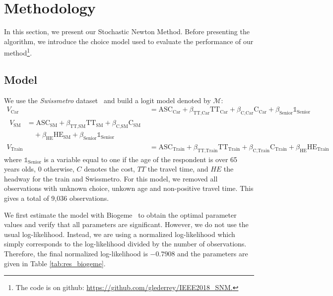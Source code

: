 \documentclass[conference]{IEEEtran}
\begin{document}
\vspace{-0.2cm}
\section{Methodology}
\label{sec:methodo}

In this section, we present our Stochastic Newton Method. Before presenting the algorithm, we introduce the choice model used to evaluate the  performance of our method\footnote{The code is on github: \href{https://github.com/glederrey/IEEE2018\_SNM}{https://github.com/glederrey/IEEE2018\_SNM.}}.
\subsection{Model}
\label{sec:model}

We use the {\it Swissmetro} dataset~\cite{bierlaire_acceptance_2001} and build a logit model denoted by $\mathcal{M}$:
\begin{align}
\label{eq:model}
V_{\text{Car}} &= \text{ASC}_{\text{Car}} + \beta_{\text{TT,Car}} \text{TT}_{\text{Car}} + \beta_{\text{C,Car}} \text{C}_{\text{Car}} + \beta_{\text{Senior}}\mathbb{1}_{\text{Senior}} \nonumber \\
\begin{split}
V_{\text{SM}} &= \text{ASC}_{\text{SM}} + \beta_{\text{TT,SM}} \text{TT}_{\text{SM}} + \beta_{\text{C,SM}} \text{C}_{\text{SM}} \\
& \quad + \beta_{\text{HE}} \text{HE}_{\text{SM}} + \beta_{\text{Senior}}\mathbb{1}_{\text{Senior}}
\end{split} \\
V_{\text{Train}} &= \text{ASC}_{\text{Train}} + \beta_{\text{TT,Train}} \text{TT}_{\text{Train}} + \beta_{\text{C,Train}} \text{C}_{\text{Train}} + \beta_{\text{HE}} \text{HE}_{\text{Train}} \nonumber
\end{align}
where $\mathbb{1}_{\text{Senior}}$ is a variable equal to one if the age of the respondent is over 65 years olds, 0 otherwise, $C$ denotes the cost, $TT$ the travel time, and $HE$ the headway for the train and Swissmetro. For this model, we removed all observations with unknown choice, unkown age and non-positive travel time. This gives a total of 9,036 observations.
 
We first estimate the model with Biogeme~\cite{bierlaire_biogeme:_2003} to obtain the optimal parameter values and verify that all parameters are significant. However, we do not use the usual log-likelihood. Instead, we are using a normalized log-likelihood which simply corresponds to the log-likelihood divided by the number of observations. Therefore, the final normalized log-likelihood is $-0.7908$ and the parameters are given in Table \ref{tab:res_biogeme}.
\end{document}
